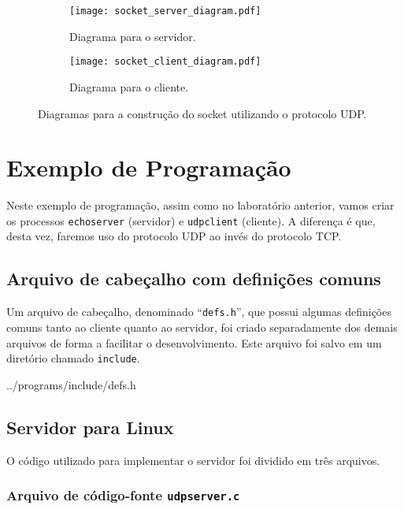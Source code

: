 \documentclass[12pt]{article}
\begin{document}
\begin{figure}[h]
  \centering
  \begin{subfigure}[b]{0.48\textwidth}
    \centering
    \texttt{[image: socket\_server\_diagram.pdf]}
    \caption{Diagrama para o servidor.}
    \label{fig:server_diagram}
  \end{subfigure}
    \hfill
  \begin{subfigure}[b]{0.48\textwidth}
    \centering
    \texttt{[image: socket\_client\_diagram.pdf]}
    \caption{Diagrama para o cliente.}
    \label{fig:client_diagram}
  \end{subfigure}
  \caption{Diagramas para a construção do socket utilizando o protocolo UDP.}
\end{figure}

\newpage

\section{Exemplo de Programação}

Neste exemplo de programação, assim como no laboratório anterior, vamos criar os
processos \texttt{echoserver} (servidor) e \texttt{udpclient} (cliente). A diferença é
que, desta vez, faremos uso do protocolo UDP ao invés do protocolo TCP.

\subsection{Arquivo de cabeçalho com definições comuns}

Um arquivo de cabeçalho, denominado ``\texttt{defs.h}'', que possui algumas definições
comuns tanto ao cliente quanto ao servidor, foi criado separadamente dos demais arquivos
de forma a facilitar o desenvolvimento. Este arquivo foi salvo em um diretório chamado
\texttt{include}.


  {../programs/include/defs.h}

\subsection{Servidor para Linux}

O código utilizado para implementar o servidor foi dividido em três arquivos.

\subsubsection{Arquivo de código-fonte \texttt{udpserver.c}}
\end{document}
